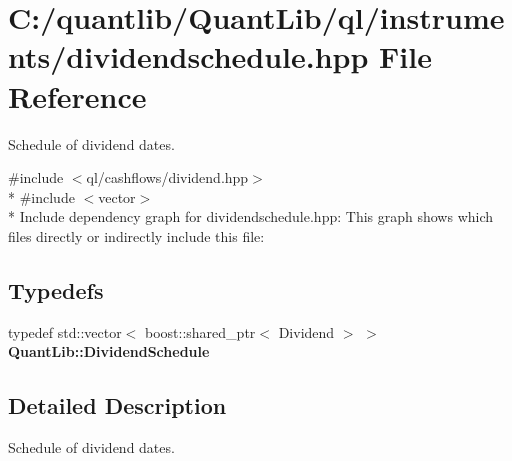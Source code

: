 \section{C\+:/quantlib/\+Quant\+Lib/ql/instruments/dividendschedule.hpp File Reference}
\label{dividendschedule_8hpp}


Schedule of dividend dates.  


{\ttfamily \#include $<$ql/cashflows/dividend.\+hpp$>$}\\*
{\ttfamily \#include $<$vector$>$}\\*
Include dependency graph for dividendschedule.\+hpp\+:
This graph shows which files directly or indirectly include this file\+:
\subsection*{Typedefs}
\begin{DoxyCompactItemize}
\item 
typedef std\+::vector$<$ boost\+::shared\+\_\+ptr$<$ Dividend $>$ $>$ {\bfseries Quant\+Lib\+::\+Dividend\+Schedule}\label{dividendschedule_8hpp_ae9d932b9be5d94438eaa9e93a70e15a0}

\end{DoxyCompactItemize}


\subsection{Detailed Description}
Schedule of dividend dates. 

